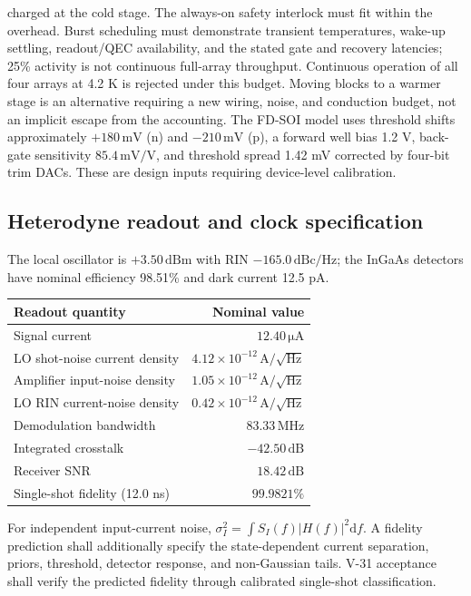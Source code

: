 \documentclass[11pt,a4paper]{article}
\newcommand{\dd}{\mathrm d}
\newcommand{\unit}[1]{\,\mathrm{#1}}
\begin{document}
charged at the cold stage. The always-on safety interlock must fit within the overhead.
Burst scheduling must demonstrate transient temperatures, wake-up settling, readout/QEC
availability, and the stated gate and recovery latencies; 25\% activity is not continuous
full-array throughput. Continuous operation of all four arrays at 4.2 K is rejected under
this budget. Moving blocks to a warmer stage is an alternative requiring a new wiring,
noise, and conduction budget, not an implicit escape from the accounting.
The FD-SOI model uses threshold shifts approximately $+180\unit{mV}$ (n) and $-210\unit{mV}$ (p), a forward well bias 1.2 V,
back-gate sensitivity $85.4\unit{mV/V}$, and threshold spread 1.42 mV corrected by four-bit
trim DACs. These are design inputs requiring device-level calibration.

\subsection{Heterodyne readout and clock specification}
The local oscillator is $+3.50\unit{dBm}$ with RIN $-165.0\unit{dBc/Hz}$;
the InGaAs detectors have nominal efficiency 98.51\% and dark current 12.5 pA.
\begin{center}\small
\begin{tabular}{@{}lr@{}}\toprule Readout quantity & Nominal value\\\midrule
Signal current & $12.40\unit{\mu A}$\\
LO shot-noise current density & $4.12\times10^{-12}\unit{A/\sqrt{Hz}}$\\
Amplifier input-noise density & $1.05\times10^{-12}\unit{A/\sqrt{Hz}}$\\
LO RIN current-noise density & $0.42\times10^{-12}\unit{A/\sqrt{Hz}}$\\
Demodulation bandwidth & $83.33\unit{MHz}$\\
Integrated crosstalk & $-42.50\unit{dB}$\\
Receiver SNR & $18.42\unit{dB}$\\
Single-shot fidelity (12.0 ns) & $99.9821\%$\\\bottomrule
\end{tabular}\end{center}
For independent input-current noise, $\sigma_I^2=\int S_I(f)|H(f)|^2\dd f$.
A fidelity prediction shall additionally specify the state-dependent current separation,
priors, threshold, detector response, and non-Gaussian tails. V-31 acceptance shall
verify the predicted fidelity through calibrated single-shot classification.
\end{document}
